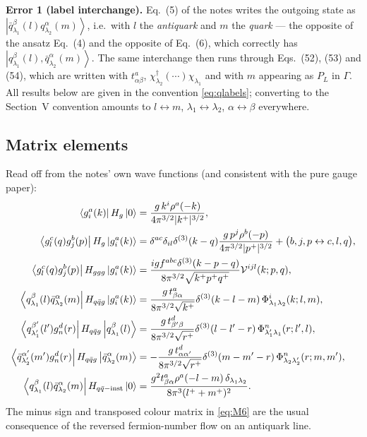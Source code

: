 \documentclass[11pt]{article}
\newcommand{\dg}{\dagger}
\newcommand{\dthree}{\delta^{(3)}}
\newcommand{\ket}[1]{\left|#1\right\rangle}
\newcommand{\bra}[1]{\left\langle#1\right|}
\newcommand{\vac}{\ket{0}}
\newcommand{\Gam}{\Gamma}
\newcommand{\Ph}{\Phi}
\newcommand{\Vg}{\mathcal{V}}
\newcommand{\qk}[3]{q^{#1}_{#2}(#3)}
\newcommand{\aqk}[3]{\bar q^{#1}_{#2}(#3)}
\newcommand{\gl}[3]{g^{#1}_{#2}(#3)}
\begin{document}
\begin{err}
\textbf{Error 1 (label interchange).} Eq.~(5) of the notes writes the outgoing state as
$\ket{\aqk{\beta}{\lambda_1}{l}\qk{\alpha}{\lambda_2}{m}}$, i.e.\ with $l$ the \emph{antiquark}
and $m$ the \emph{quark} --- the opposite of the ansatz Eq.~(4) and the opposite of Eq.~(6),
which correctly has $\ket{\qk{\beta}{\lambda_1}{l},\aqk{\alpha}{\lambda_2}{m}}$. The same
interchange then runs through Eqs.~(52), (53) and (54), which are written with
$t^{a}_{\alpha\beta}$, $\chi^{\dg}_{\lambda_2}(\cdots)\chi_{\lambda_1}$ and with $m$ appearing as
$P_L$ in $\Gam$. All results below are given in the convention \eqref{eq:qlabels}; converting to
the Section~V convention amounts to $l\!\leftrightarrow\! m$, $\lambda_1\!\leftrightarrow\!
\lambda_2$, $\alpha\!\leftrightarrow\!\beta$ everywhere.
\end{err}

\subsection{Matrix elements}

Read off from the notes' own wave functions (and consistent with the pure gauge paper):
\begin{align}
\bra{\gl{a}{i}{k}}H_{g}\vac&=\frac{g\,k^{i}\rho^{a}(-k)}{4\pi^{3/2}|k^{+}|^{3/2}},
\label{eq:M1}\\
\bra{\gl{c}{l}{q}\gl{b}{j}{p}}H_{g}\ket{\gl{a}{i}{k}}&=
\delta^{ac}\delta_{il}\dthree(k-q)\frac{g\,p^{j}\rho^{b}(-p)}{4\pi^{3/2}|p^{+}|^{3/2}}
+\big(b,j,p\leftrightarrow c,l,q\big),
\label{eq:M2}\\
\bra{\gl{c}{l}{q}\gl{b}{j}{p}}H_{ggg}\ket{\gl{a}{i}{k}}&=
\frac{igf^{abc}\dthree(k-p-q)}{8\pi^{3/2}\sqrt{k^{+}p^{+}q^{+}}}\Vg^{ijl}(k;p,q),
\label{eq:M3}\\
\bra{\qk{\beta}{\lambda_1}{l}\aqk{\alpha}{\lambda_2}{m}}H_{q\bar qg}\ket{\gl{a}{i}{k}}&=
\frac{g\,t^{a}_{\beta\alpha}}{8\pi^{3/2}\sqrt{k^{+}}}\dthree(k-l-m)\,
\Ph^{i}_{\lambda_1\lambda_2}(k;l,m),
\label{eq:M4}\\
\bra{\qk{\beta'}{\lambda_1'}{l'}\gl{d}{n}{r}}H_{q\bar qg}\ket{\qk{\beta}{\lambda_1}{l}}&=
\frac{g\,t^{d}_{\beta'\beta}}{8\pi^{3/2}\sqrt{r^{+}}}\dthree(l-l'-r)\,
\Ph^{n}_{\lambda_1'\lambda_1}(r;l',l),
\label{eq:M5}\\
\bra{\aqk{\alpha'}{\lambda_2'}{m'}\gl{d}{n}{r}}H_{q\bar qg}\ket{\aqk{\alpha}{\lambda_2}{m}}&=
-\frac{g\,t^{d}_{\alpha\alpha'}}{8\pi^{3/2}\sqrt{r^{+}}}\dthree(m-m'-r)\,
\Ph^{n}_{\lambda_2\lambda_2'}(r;m,m'),
\label{eq:M6}\\
\bra{\qk{\beta}{\lambda_1}{l}\aqk{\alpha}{\lambda_2}{m}}H_{q\bar q-\rm inst}\vac&=
\frac{g^{2}t^{a}_{\beta\alpha}\rho^{a}(-l-m)\,\delta_{\lambda_1\lambda_2}}{8\pi^{3}(l^{+}+m^{+})^{2}} .
\label{eq:M7}
\end{align}
The minus sign and transposed colour matrix in \eqref{eq:M6} are the usual consequence of the
reversed fermion-number flow on an antiquark line.
\end{document}
